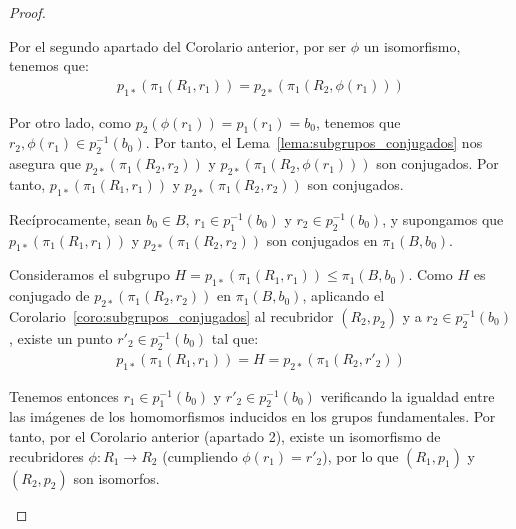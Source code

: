 \begin{teo}
\begin{proof}
\begin{description}
            Por el segundo apartado del Corolario anterior, por ser $\phi$ un isomorfismo, tenemos que:
            \begin{gather*}
                p_{1*}(\pi_1(R_1,r_1)) = p_{2*}(\pi_1(R_2, \phi(r_1)))
            \end{gather*}

            Por otro lado, como $p_2(\phi(r_1)) = p_1(r_1) = b_0$, tenemos que $r_2,\phi(r_1)\in p_2^{-1}(b_0)$. Por tanto, el Lema~\ref{lema:subgrupos_conjugados} nos asegura que $p_{2*}(\pi_1(R_2, r_2))$ y $p_{2*}(\pi_1(R_2, \phi(r_1)))$ son conjugados. Por tanto, $p_{1*}(\pi_1(R_1,r_1))$ y $p_{2*}(\pi_1(R_2, r_2))$ son conjugados.


            \item[$\Longleftarrow$)] Recíprocamente, sean $b_0\in B$, $r_1\in p_1^{-1}(b_0)$ y $r_2\in p_2^{-1}(b_0)$, y supongamos que $p_{1*}(\pi_1(R_1,r_1))$ y $p_{2*}(\pi_1(R_2, r_2))$ son conjugados en $\pi_1(B,b_0)$.

            Consideramos el subgrupo $H = p_{1*}(\pi_1(R_1,r_1)) \le \pi_1(B,b_0)$. Como $H$ es conjugado de $p_{2*}(\pi_1(R_2, r_2))$ en $\pi_1(B,b_0)$, aplicando el Corolario~\ref{coro:subgrupos_conjugados} al recubridor $(R_2, p_2)$ y a $r_2 \in p_2^{-1}(b_0)$, existe un punto $r'_2 \in p_2^{-1}(b_0)$ tal que:
            \begin{gather*}
                p_{1*}(\pi_1(R_1,r_1)) = H = p_{2*}(\pi_1(R_2, r'_2))
            \end{gather*}

            Tenemos entonces $r_1 \in p_1^{-1}(b_0)$ y $r'_2 \in p_2^{-1}(b_0)$ verificando la igualdad entre las imágenes de los homomorfismos inducidos en los grupos fundamentales. Por tanto, por el Corolario anterior (apartado 2), existe un isomorfismo de recubridores $\phi: R_1 \longrightarrow R_2$ (cumpliendo $\phi(r_1) = r'_2$), por lo que $(R_1, p_1)$ y $(R_2, p_2)$ son isomorfos.
        \end{description}
    \end{proof}
\end{teo}

